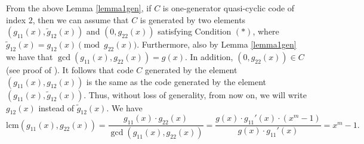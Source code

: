 \documentclass[12 pt]{extarticle}
\numberwithin{equation}{section}
\newtheorem{lemma}[theorem]{Lemma}
\theoremstyle{definition}
\begin{document}
From the above Lemma \ref{lemma1gen}, if $C$ is one-generator quasi-cyclic code of index $2$, then we can assume that $C$ is   generated by two elements $(g_{11}(x), \tilde{g}_{12}(x))$ and $(0, g_{22}(x))$ satisfying Condition $(\ast)$, where 
  $\tilde{g}_{12}(x)=g_{12}(x) \pmod{g_{22}(x)}$. Furthermore, also by Lemma \ref{lemma1gen} we have that  $\gcd(g_{11}(x),g_{22}(x))=g(x)$.  In addition,  $(0,g_{22}(x))\in C$ (see proof of \cite[Lemma 2.4]{Abdukhalikov20252}). It follows that  code $C$ generated by the element $(g_{11}(x),g_{12}(x))$ is the same as the code generated by the element $(g_{11}(x),\tilde{g}_{12}(x))$. Thus, without loss of generality, from now on, we will write $g_{12}(x)$ instead of $\tilde{g}_{12}(x)$.
  We have 
  \begin{equation}\label{1geneq}
      \text{lcm}(g_{11}(x),g_{22}(x)) = \dfrac{g_{11}(x)\cdot g_{22}(x)}{\gcd(g_{11}(x),g_{22}(x))} = \dfrac{g(x) \cdot g_{11}'(x) \cdot (x^m-1)}{g(x) \cdot g_{11}'(x)} = x^m-1.
  \end{equation}

\end{document}
